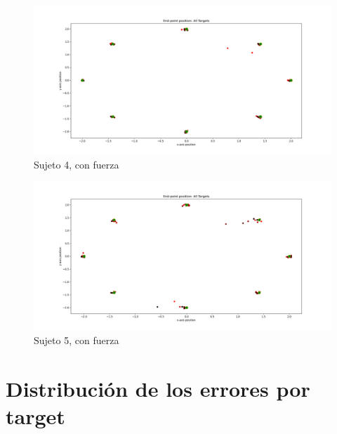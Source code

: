 \documentclass[a4paper,11pt, oneside]{book}
\begin{document}
\begin{figure}[H]
	\includegraphics[width=\linewidth]{sujeto4/force/trayectorias_puntos}
	\caption{Sujeto 4, con fuerza}
	\label{4-2-1}
\end{figure}
\begin{figure}[H]
	\includegraphics[width=\linewidth]{sujeto5/force/trayectorias_puntos}
	\caption{Sujeto 5, con fuerza}
	\label{5-2-1}
\end{figure}

\section{Distribución de los errores por target}
\label{anexo:3}
\end{document}
